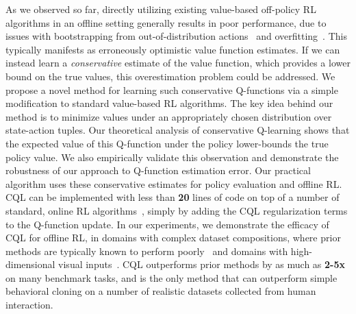 As we observed so far, directly utilizing existing value-based off-policy RL algorithms in an offline setting generally results in poor performance, due to issues with bootstrapping from out-of-distribution actions~\citep{kumar2019stabilizing,fujimoto2018off} and overfitting~\citep{fu2019diagnosing,kumar2019stabilizing,agarwal2019optimistic}. This typically manifests as erroneously optimistic value function estimates. If we can instead learn a \emph{conservative} estimate of the value function, which provides a lower bound on the true values, this overestimation problem could be addressed. We propose a novel method for learning such conservative Q-functions via a simple modification to standard value-based RL algorithms. The key idea behind our method is to minimize values under an appropriately chosen distribution over state-action tuples. Our theoretical analysis of conservative Q-learning shows that the expected value of this Q-function under the policy lower-bounds the true policy value. We also empirically validate this observation and demonstrate the robustness of our approach to Q-function estimation error. Our practical algorithm uses these conservative estimates for policy evaluation and offline RL. CQL can be implemented with less than \textbf{20} lines of code on top of a number of standard, online RL algorithms~\citep{haarnoja,dabney2018distributional}, simply by adding the CQL regularization terms to the Q-function update. In our experiments, we demonstrate the efficacy of CQL for offline RL, in domains with complex dataset compositions, where prior methods are typically known to perform poorly~\citep{d4rl} and domains with high-dimensional visual inputs~\citep{bellemare2013arcade,agarwal2019optimistic}. CQL outperforms prior methods by as much as \textbf{2-5x} on many benchmark tasks, and is the only method that can outperform simple behavioral cloning on a number of realistic datasets collected from human interaction.

